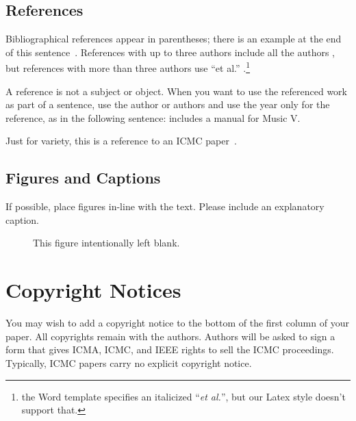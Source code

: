 \documentclass[10pt,a4paper]{article}
\begin{document}
\subsection{References}


Bibliographical references appear in parentheses; there is an example
at the end of this sentence~\cite{canon}.  References with up to
three authors include all the authors \cite{fugue}, but references
with more than three authors use ``et al.''
{}.\footnote{the Word template specifies an
italicized ``\emph{et al.}'', but our Latex style doesn't support that.}

A reference is not a subject or object. When you want to use the
referenced work as part of a sentence, use the author or authors and
use the year only for the reference, as in the following sentence:
 includes a manual for Music V\@.  

Just for variety, this is a reference to an ICMC
paper~\cite{superscalar}.

\subsection{Figures and Captions}

If possible, place figures in-line with the text.  Please include an
explanatory caption.

\begin{figure}[htbp]
  \begin{center}

    \framebox[7cm]{\rule[-5mm]{0cm}{5cm} }

    \caption{This figure intentionally left blank.} 
    \label{fig:emptybox}
  \end{center}
\end{figure}

\section{Copyright Notices}

You may wish to add a copyright notice to the bottom of the first
column of your paper.  All copyrights remain with the authors.
Authors will be asked to sign a form that gives ICMA, ICMC, and IEEE
rights to sell the ICMC proceedings.  Typically, ICMC papers carry no
explicit copyright notice.


\small{

}
\end{document}
